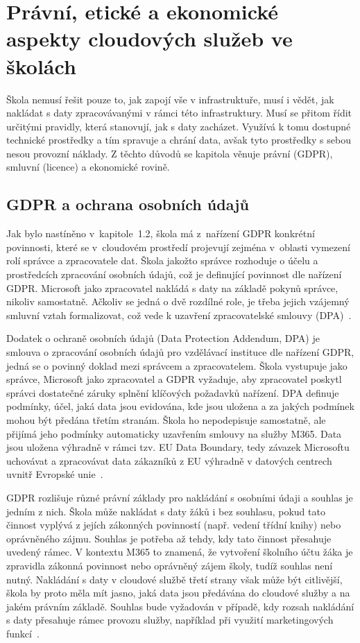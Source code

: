 \documentclass[male,czech,api_bc]{kitheses}
\begin{document}
\chapter{Právní, etické a ekonomické aspekty cloudových služeb ve školách}
Škola nemusí řešit pouze to, jak zapojí vše v infrastruktuře, musí i vědět, jak nakládat s daty zpracovávanými v rámci této infrastruktury. Musí se přitom řídit určitými pravidly, která stanovují, jak s daty zacházet. Využívá k tomu dostupné technické prostředky a tím spravuje a chrání data, avšak tyto prostředky s sebou nesou provozní náklady. Z těchto důvodů se kapitola věnuje právní (GDPR), smluvní (licence) a ekonomické rovině. 

\section{GDPR a ochrana osobních údajů}
Jak bylo nastíněno v~kapitole~1.2, škola má z~nařízení GDPR konkrétní povinnosti, které se v~cloudovém prostředí projevují zejména v~oblasti vymezení rolí správce a zpracovatele dat.
Škola jakožto správce rozhoduje o účelu a prostředcích zpracování osobních údajů, což je definující povinnost dle nařízení GDPR. Microsoft jako zpracovatel nakládá s daty na základě pokynů správce, nikoliv samostatně. Ačkoliv se jedná o dvě rozdílné role, je třeba jejich vzájemný smluvní vztah formalizovat, což vede k uzavření zpracovatelské smlouvy (DPA)~\cite{GDPR2016}.

Dodatek o ochraně osobních údajů (Data Protection Addendum, DPA) je smlouva o zpracování osobních údajů pro vzdělávací instituce dle nařízení GDPR, jedná se o povinný doklad mezi správcem a zpracovatelem. Škola vystupuje jako správce, Microsoft jako zpracovatel a GDPR vyžaduje, aby zpracovatel poskytl správci dostatečné záruky splnění klíčových požadavků nařízení. DPA definuje podmínky, účel, jaká data jsou evidována, kde jsou uložena a za jakých podmínek mohou být předána třetím stranám. Škola ho nepodepisuje samostatně, ale přijímá jeho podmínky automaticky uzavřením smlouvy na služby M365. Data jsou uložena výhradně v rámci tzv. EU Data Boundary, tedy závazek Microsoftu uchovávat a zpracovávat data zákazníků z EU výhradně v datových centrech uvnitř Evropské unie~\cite{MicrosoftDPA2025}.

GDPR rozlišuje různé právní základy pro nakládání s osobními údaji a souhlas je jedním z nich. Škola může nakládat s daty žáků i bez souhlasu, pokud tato činnost vyplývá z jejích zákonných povinností (např. vedení třídní knihy) nebo oprávněného zájmu. Souhlas je potřeba až tehdy, kdy tato činnost přesahuje uvedený rámec. V kontextu M365 to znamená, že vytvoření školního účtu žáka je zpravidla zákonná povinnost nebo oprávněný zájem školy, tudíž souhlas není nutný. Nakládání s daty v cloudové službě třetí strany však může být citlivější, škola by proto měla mít jasno, jaká data jsou předávána do cloudové služby a na jakém právním základě. Souhlas bude vyžadován v případě, kdy rozsah nakládání s daty přesahuje rámec provozu služby, například při využití marketingových funkcí~\cite{GDPR2016, MicrosoftDPA2025}.
\end{document}
